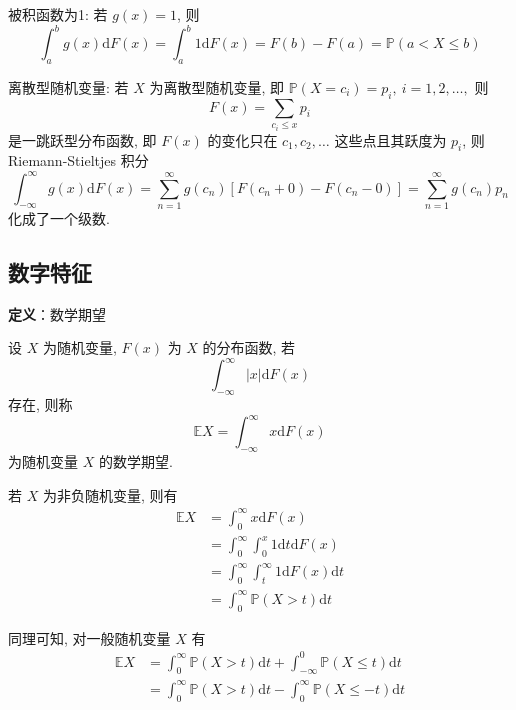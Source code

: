 \documentclass[openany]{ctexbook}
\theoremstyle{kaiti}
\theoremstyle{normal}
\begin{document}
被积函数为1: 若 $g(x)=1$, 则
\begin{equation}
  \int_a^bg(x)\mathrm{d}F(x)=\int_a^b1\mathrm{d}F(x)=F(b)-F(a)=\mathbb{P}(a<X\leqslant b)
\end{equation}

离散型随机变量: 若 $X$ 为离散型随机变量, 即 $\mathbb{P}(X=c_i)=p_i,~i=1,2,\ldots,$ 则
\begin{equation}
  F(x)=\sum_{c_i\leqslant x}p_i
\end{equation}
是一跳跃型分布函数, 即 $F(x)$ 的变化只在 $c_1,c_2,\ldots$ 这些点且其跃度为 $p_i$, 则 Riemann-Stieltjes 积分
\begin{equation}
  \int_{-\infty}^\infty g(x)\mathrm{d}F(x)=\sum_{n=1}^\infty g(c_n)[F(c_n+0)-F(c_n-0)]=\sum_{n=1}^\infty g(c_n)p_n
\end{equation}
化成了一个级数.

\subsection{数字特征}

\textbf{定义}：数学期望

设 $X$ 为随机变量, $F(x)$ 为 $X$ 的分布函数, 若
\begin{equation}
  \int_{-\infty}^\infty |x|\mathrm{d}F(x)
\end{equation}
存在, 则称
\begin{equation}
  \mathbb{E}X=\int_{-\infty}^\infty x\mathrm{d}F(x)
\end{equation}
为随机变量 $X$ 的数学期望.

若 $X$ 为非负随机变量, 则有
\begin{equation}
  \begin{aligned}
    \mathbb{E}X
    &=\int_{0}^\infty x\mathrm{d}F(x)\\
    &=\int_{0}^\infty\int_0^x1\mathrm{d}t\mathrm{d}F(x)\\
    &=\int_{0}^\infty\int_t^\infty1\mathrm{d}F(x)\mathrm{d}t\\
    &=\int_0^\infty \mathbb{P}(X>t)\mathrm{d}t
  \end{aligned}
\end{equation}

同理可知, 对一般随机变量 $X$ 有
\begin{equation}
  \begin{aligned}
    \mathbb{E}X
    &=\int_0^\infty \mathbb{P}(X>t)\mathrm{d}t+\int_{-\infty}^0\mathbb{P}(X\leqslant t)\mathrm{d}t\\
    &=\int_0^\infty \mathbb{P}(X>t)\mathrm{d}t-\int_0^\infty \mathbb{P}(X\leqslant -t)\mathrm{d}t\\
  \end{aligned}
\end{equation}
\end{document}
